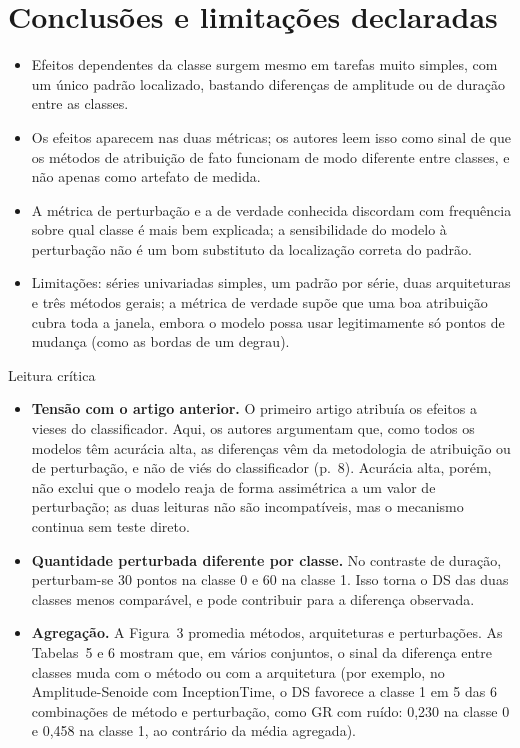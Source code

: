 \documentclass[11pt,a4paper]{article}
\begin{document}
\section{Conclusões e limitações declaradas}
\begin{itemize}
\item Efeitos dependentes da classe surgem mesmo em tarefas muito simples, com um único padrão localizado, bastando diferenças de amplitude ou de duração entre as classes.
\item Os efeitos aparecem nas duas métricas; os autores leem isso como sinal de que os métodos de atribuição de fato funcionam de modo diferente entre classes, e não apenas como artefato de medida.
\item A métrica de perturbação e a de verdade conhecida discordam com frequência sobre qual classe é mais bem explicada; a sensibilidade do modelo à perturbação não é um bom substituto da localização correta do padrão.
\item Limitações: séries univariadas simples, um padrão por série, duas arquiteturas e três métodos gerais; a métrica de verdade supõe que uma boa atribuição cubra toda a janela, embora o modelo possa usar legitimamente só pontos de mudança (como as bordas de um degrau).
\end{itemize}
\begin{infobox}[warn]{Leitura crítica}
\begin{itemize}
\item \textbf{Tensão com o artigo anterior.} O primeiro artigo atribuía os efeitos a vieses do classificador. Aqui, os autores argumentam que, como todos os modelos têm acurácia alta, as diferenças vêm da metodologia de atribuição ou de perturbação, e não de viés do classificador (p.~8). Acurácia alta, porém, não exclui que o modelo reaja de forma assimétrica a um valor de perturbação; as duas leituras não são incompatíveis, mas o mecanismo continua sem teste direto.
\item \textbf{Quantidade perturbada diferente por classe.} No contraste de duração, perturbam-se 30 pontos na classe 0 e 60 na classe 1. Isso torna o DS das duas classes menos comparável, e pode contribuir para a diferença observada.
\item \textbf{Agregação.} A Figura~3 promedia métodos, arquiteturas e perturbações. As Tabelas~5 e 6 mostram que, em vários conjuntos, o sinal da diferença entre classes muda com o método ou com a arquitetura (por exemplo, no Amplitude-Senoide com InceptionTime, o DS favorece a classe 1 em 5 das 6 combinações de método e perturbação, como GR com ruído: 0,230 na classe 0 e 0,458 na classe 1, ao contrário da média agregada).
\end{itemize}
\end{infobox}
\end{document}
